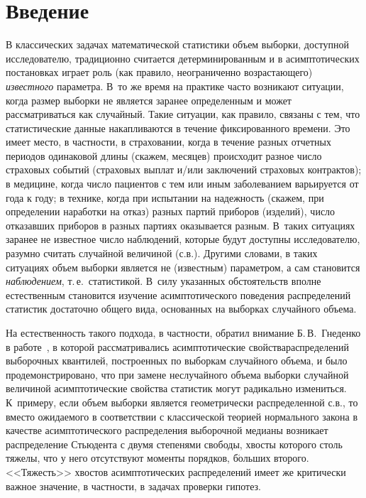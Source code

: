       \begin{multicols}{2}

            \label{st\stat}


\section{Введение}

В классических задачах математической статистики объем выборки,
доступной исследователю, традиционно считается детерминированным и в
асимптотических постановках играет роль (как правило, неограниченно
возрастающего) {\it известного} параметра. В~то же время на практике
час\-то возникают ситуации, когда размер выборки не является заранее
определенным и может рас\-смат\-ри\-вать\-ся как случайный. Такие ситуации,
как правило, связаны с тем, что статистические данные накапливаются
в течение фиксированного времени. Это \mbox{имеет} место, в частности, в
страховании, когда в течение разных отчетных периодов одинаковой
длины (скажем, месяцев) происходит разное число страховых событий
(страховых выплат и/или заключений страховых контрактов); в
медицине, когда число пациентов с тем или иным заболеванием
варьируется от года к году; в технике, когда при испытании на
надежность (скажем, при определении наработки на отказ) разных
партий приборов (изделий), чис\-ло отказавших приборов в разных
партиях оказывается разным. В~таких ситуациях заранее не известное
число наблюдений, которые будут доступны исследователю, разумно
считать случайной величиной (с.в.). Другими словами, в таких ситуациях
объем выборки является не (известным) параметром, а сам становится
{\it наблюдением}, т.\,е.\ статистикой. В~силу указанных
обстоятельств вполне естественным становится изуче\-ние
асимптотического поведения распределений статистик достаточно общего
вида, основанных на выборках случайного объема.

На естественность такого подхода, в частности, обратил внимание
Б.\,В.~Гнеденко в работе~\cite{2-ben}, в которой рассматривались
асимптотические свойства\linebreak распределений выборочных квантилей,
построенных по выборкам случайного объема, и было
продемонстрировано, что при замене неслучайного \mbox{объема} выборки
случайной величиной асимптотические свойства статистик могут
радикально измениться. К~примеру, если объем выборки является
геометрически распределенной с.в., то вместо
ожидаемого в соответствии с классической теорией нормального закона
в качестве асимптотического распределения выборочной медианы
возникает распределение Стьюдента с двумя степенями свободы, хвосты
которого столь тяжелы, что у него отсутствуют моменты порядков,
б$\acute{\mbox{о}}$льших второго. <<Тяжесть>> хвостов асимптотических распределений
имеет же  критически важное значение, в частности, в задачах проверки
гипотез.


\end{multicols}
